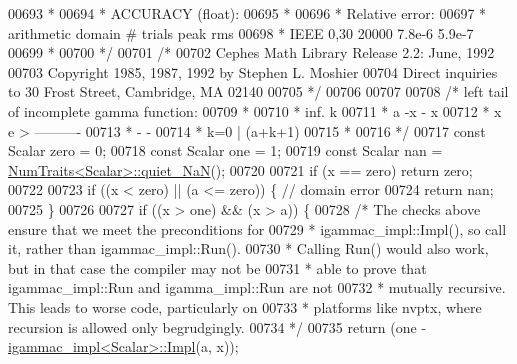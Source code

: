 \begin{DoxyCode}
00693 \textcolor{comment}{     *}
00694 \textcolor{comment}{     * ACCURACY (float):}
00695 \textcolor{comment}{     *}
00696 \textcolor{comment}{     *                      Relative error:}
00697 \textcolor{comment}{     * arithmetic   domain     # trials      peak         rms}
00698 \textcolor{comment}{     *    IEEE      0,30        20000       7.8e-6      5.9e-7}
00699 \textcolor{comment}{     *}
00700 \textcolor{comment}{     */}
00701     \textcolor{comment}{/*}
00702 \textcolor{comment}{      Cephes Math Library Release 2.2: June, 1992}
00703 \textcolor{comment}{      Copyright 1985, 1987, 1992 by Stephen L. Moshier}
00704 \textcolor{comment}{      Direct inquiries to 30 Frost Street, Cambridge, MA 02140}
00705 \textcolor{comment}{    */}
00706 
00707 
00708     \textcolor{comment}{/* left tail of incomplete gamma function:}
00709 \textcolor{comment}{     *}
00710 \textcolor{comment}{     *          inf.      k}
00711 \textcolor{comment}{     *   a  -x   -       x}
00712 \textcolor{comment}{     *  x  e     >   ----------}
00713 \textcolor{comment}{     *           -     -}
00714 \textcolor{comment}{     *          k=0   | (a+k+1)}
00715 \textcolor{comment}{     *}
00716 \textcolor{comment}{     */}
00717     \textcolor{keyword}{const} Scalar zero = 0;
00718     \textcolor{keyword}{const} Scalar one = 1;
00719     \textcolor{keyword}{const} Scalar nan = \hyperlink{group___core___module_struct_eigen_1_1_num_traits}{NumTraits<Scalar>::quiet\_NaN}();
00720 
00721     \textcolor{keywordflow}{if} (x == zero) \textcolor{keywordflow}{return} zero;
00722 
00723     \textcolor{keywordflow}{if} ((x < zero) || (a <= zero)) \{  \textcolor{comment}{// domain error}
00724       \textcolor{keywordflow}{return} nan;
00725     \}
00726 
00727     \textcolor{keywordflow}{if} ((x > one) && (x > a)) \{
00728       \textcolor{comment}{/* The checks above ensure that we meet the preconditions for}
00729 \textcolor{comment}{       * igammac\_impl::Impl(), so call it, rather than igammac\_impl::Run().}
00730 \textcolor{comment}{       * Calling Run() would also work, but in that case the compiler may not be}
00731 \textcolor{comment}{       * able to prove that igammac\_impl::Run and igamma\_impl::Run are not}
00732 \textcolor{comment}{       * mutually recursive.  This leads to worse code, particularly on}
00733 \textcolor{comment}{       * platforms like nvptx, where recursion is allowed only begrudgingly.}
00734 \textcolor{comment}{       */}
00735       \textcolor{keywordflow}{return} (one - \hyperlink{struct_eigen_1_1internal_1_1igammac__impl}{igammac\_impl<Scalar>::Impl}(a, x));

\end{DoxyCode}
